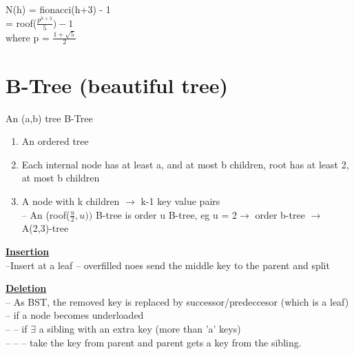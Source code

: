 \documentclass[12pt]{article}
\newcommand{\myt}[1]{\textbf{\underline{#1}}}
\begin{document}
	N(h) = fionacci(h+3) - 1\\
	= roof($\frac{p^{h+3}}{5}) - 1$\\
	where p = $\frac{1 + \sqrt{5}}{2}$\\
		
	\section*{B-Tree (beautiful tree)}
		
	\begin{center}\end{center}

	An (a,b) tree B-Tree\\
	\begin{enumerate}
		\item An ordered tree
		\item Each internal node has at least a, and at most b children, root has at least 2, at most b children
		\item A node with k children $\rightarrow$ k-1 key value pairs\\
				-- An (roof($\frac{u}{2}, u))$ B-tree is order u B-tree, eg u = 2$\rightarrow$ order b-tree $\rightarrow$ A(2,3)-tree
	\end{enumerate}
	
	\myt{Insertion}\\
	--Insert at a leaf
	-- overfilled noes send the middle key to the parent and split
	
	\myt{Deletion}\\
	-- As BST, the removed key is replaced by successor/predeccesor (which is a leaf)\\
	-- if a node becomes underloaded\\
	-- -- if $\exists$ a sibling with an extra key (more than 'a' keys)\\
	-- -- -- take the key from parent and parent gets a key from the sibling.\\
	
\end{document}
